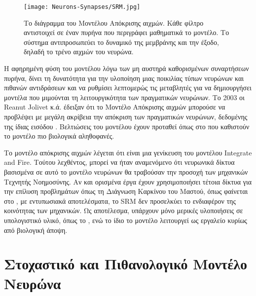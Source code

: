 \documentclass[12pt]{report}
\begin{document}
\begin{figure}[htp]
    \centering
    \texttt{[image: Neurons-Synapses/SRM.jpg]}
    \caption{Το διάγραμμα του Μοντέλου Απόκρισης αιχμών. Κάθε φίλτρο αντιστοιχεί σε έναν πυρήνα που περιγράφει μαθηματικά το μοντέλο. Το σύστημα αντιπροσωπεύει το δυναμικό της μεμβράνης και την έξοδο, δηλαδή το τρένο αιχμών του νευρώνα.}
    \label{fig:lif-neuron}
\end{figure}

Η αφηρημένη φύση του μοντέλου λόγω των μη αυστηρά καθορισμένων συναρτήσεων πυρήνα, δίνει τη δυνατότητα για την υλοποίηση μιας ποικιλίας τύπων νευρώνων και πιθανών αντιδράσεων και να ρυθμίσει λεπτομερώς τις μεταβλητές για να δημιουργήσει μοντέλα που μιμούνται τη λειτουργικότητα των πραγματικών νευρώνων. Το 2003 οι \textlatin{Reanut Jolivet} κ.ά. έδειξαν ότι το Μοντέλο Απόκρισης αιχμών μπορούσε να προβλέψει με μεγάλη ακρίβεια την απόκριση των πραγματικών νευρώνων, δεδομένης της ίδιας εισόδου \cite{Jolivet2003}. Βελτιώσεις του μοντέλου έχουν προταθεί όπως στο \cite{Bohte2012} που καθιστούν το μοντέλο πιο βιολογικά αληθοφανές.

Το μοντέλο απόκρισης αιχμών λέγεται ότι είναι μια γενίκευση του μοντέλου \textlatin{Integrate and Fire}. Τούτου λεχθέντος, μπορεί να ήταν αναμενόμενο ότι νευρωνικά δίκτυα βασισμένα σε αυτό το μοντέλο νευρώνων θα τραβούσαν την προσοχή των μηχανικών Τεχνητής Νοημοσύνης. Αν και ορισμένα έργα έχουν χρησιμοποιήσει τέτοια δίκτυα για την επίλυση προβλημάτων όπως τη Διάγνωση Καρκίνου του Μαστού, όπως φαίνεται στο \cite{Ourdighi2016}, με εντυπωσιακά αποτελέσματα, το \textlatin{SRM} δεν προσελκύει το ενδιαφέρον της κοινότητας των μηχανικών. Ως αποτέλεσμα, υπάρχουν μόνο μερικές υλοποιήσεις σε υπολογιστικό υλικό, όπως το \cite{Clayton2011}, ενώ το ίδιο το μοντέλο λειτουργεί ως εργαλείο κυρίως από βιολογική άποψη.

\section{Στοχαστικό και Πιθανολογικό Μοντέλο Νευρώνα}
\end{document}
